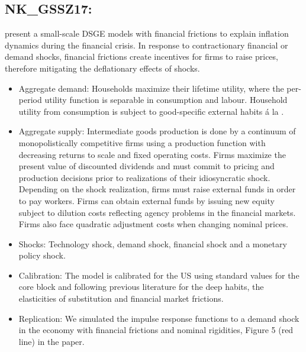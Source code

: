 \documentclass[11pt,a4paper]{article}
\begin{document}
	
	\subsection{NK\_GSSZ17: \texorpdfstring{\cite{gilchrist2017inflation}}{Gilchrist et al. (2017)}}
	\label{NKGSSZ17}
	\cite{gilchrist2017inflation} present a small-scale DSGE models with financial frictions to explain inflation dynamics during the financial crisis. In response to contractionary financial or demand shocks, financial frictions create incentives for firms to raise prices, therefore mitigating the deflationary effects of shocks. 
	
	\begin{itemize}
		\item Aggregate demand: Households maximize their lifetime utility, where the per-period utility function is separable in consumption and labour. Household utility from consumption is subject to good-specific external habits \'{a} la \cite{ravn2006deep}.
		
		\item Aggregate  supply: Intermediate goods production is done by a continuum of monopolistically competitive firms using a production function with decreasing returns to scale and fixed operating costs. Firms maximize the present value of discounted dividends and must commit to pricing and production decisions prior to realizations of their idiosyncratic shock. Depending on the shock realization, firms must raise external funds in order to pay workers. Firms can obtain external funds by issuing new equity subject to dilution costs reflecting agency problems in the financial markets. Firms also face \cite{Rotemberg1982} quadratic adjustment costs when changing nominal prices.
		
		\item Shocks: Technology shock, demand shock, financial shock and a monetary policy shock.
		
		\item Calibration: The model is calibrated for the US using standard values for the core block and following previous literature for the deep habits, the elasticities of substitution and financial market frictions.
		
		\item Replication: We simulated the impulse response functions to a demand shock in the economy with financial frictions and nominal rigidities, Figure 5 (red line) in the paper.
	\end{itemize}
	
\end{document}
